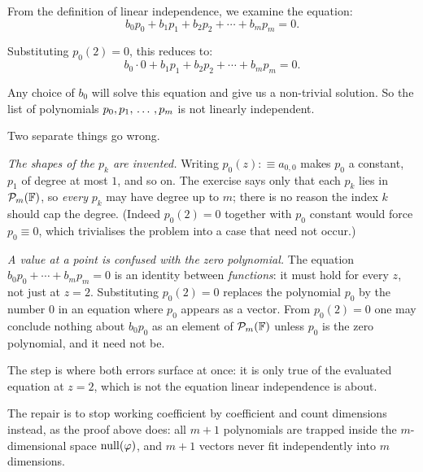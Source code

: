 \begin{xrcs}
\begin{failedattempt}
    From the definition of linear independence, we examine the equation:
    \[
      b_0 p_0 + b_1 p_1 + b_2 p_2 + \cdots + b_m p_m = 0.
    \]

    Substituting $p_0(2) = 0$, this reduces to:
    \[
      b_0 \cdot 0 + b_1 p_1 + b_2 p_2 + \cdots + b_m p_m = 0.
    \]

    Any choice of $b_0$ will solve this equation and give us a non-trivial solution.
    So the list of polynomials $p_0, p_1, {\, \ldots \,\,}, p_m$ is not linearly independent.
  \end{failedattempt}

  \begin{ainote}
    Two separate things go wrong.

    \emph{The shapes of the $p_k$ are invented.} Writing $p_0(z) :\equiv a_{0,0}$ makes $p_0$ a constant, $p_1$ of degree at most $1$, and so on. The exercise says only that each $p_k$ lies in $\mathcal{P}_m(\mathbb{F})$, so \emph{every} $p_k$ may have degree up to $m$; there is no reason the index $k$ should cap the degree. (Indeed $p_0(2)=0$ together with $p_0$ constant would force $p_0 \equiv 0$, which trivialises the problem into a case that need not occur.)

    \emph{A value at a point is confused with the zero polynomial.} The equation $b_0 p_0 + \cdots + b_m p_m = 0$ is an identity between \emph{functions}: it must hold for every $z$, not just at $z = 2$. Substituting $p_0(2) = 0$ replaces the polynomial $p_0$ by the number $0$ in an equation where $p_0$ appears as a vector. From $p_0(2)=0$ one may conclude nothing about $b_0 p_0$ as an element of $\mathcal{P}_m(\mathbb{F})$ unless $p_0$ is the zero polynomial, and it need not be.

    The step  is where both errors surface at once: it is only true of the evaluated equation at $z = 2$, which is not the equation linear independence is about.

    The repair is to stop working coefficient by coefficient and count dimensions instead, as the proof above does: all $m+1$ polynomials are trapped inside the $m$-dimensional space $\operatorname{null}(\varphi)$, and $m+1$ vectors never fit independently into $m$ dimensions.
  \end{ainote}
\end{xrcs}

\clearpage
